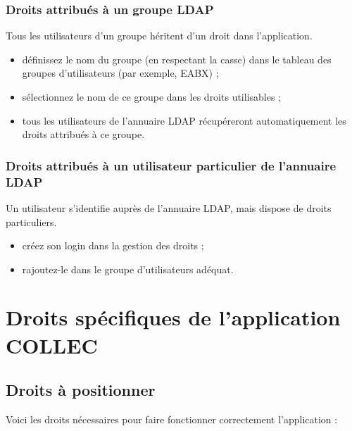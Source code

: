 \subsubsection{Droits attribués à un groupe LDAP}

Tous les utilisateurs d'un groupe héritent d'un droit dans l'application.

\begin{itemize}
\item définissez le nom du groupe (en respectant la casse) dans le tableau des groupes d'utilisateurs (par exemple, EABX) ;
\item sélectionnez le nom de ce groupe dans les droits utilisables ;
\item tous les utilisateurs de l'annuaire LDAP récupéreront automatiquement les droits attribués à ce groupe.
\end{itemize}

\subsubsection{Droits attribués à un utilisateur particulier de l'annuaire LDAP}

Un utilisateur s'identifie auprès de l'annuaire LDAP, mais dispose de droits particuliers.

\begin{itemize}
\item créez son login dans la gestion des droits ;
\item rajoutez-le dans le groupe d'utilisateurs adéquat.
\end{itemize}


\section{Droits spécifiques de l'application COLLEC}

\subsection{Droits à positionner}
Voici les droits nécessaires pour faire fonctionner correctement l'application :

